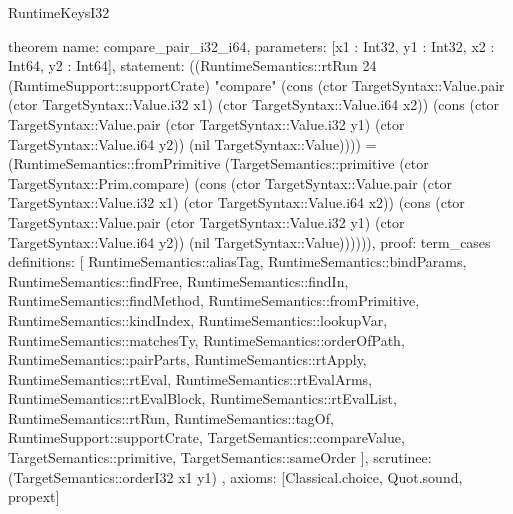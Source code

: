 \begin{lexlean}{RuntimeKeysI32}
\begin{semanticmodule}
theorem{
  name: compare_pair_i32_i64,
  parameters: [x1 : Int32, y1 : Int32, x2 : Int64, y2 : Int64],
  statement: ((RuntimeSemantics::rtRun 24 (RuntimeSupport::supportCrate) "compare" (cons (ctor TargetSyntax::Value.pair (ctor TargetSyntax::Value.i32 x1) (ctor TargetSyntax::Value.i64 x2)) (cons (ctor TargetSyntax::Value.pair (ctor TargetSyntax::Value.i32 y1) (ctor TargetSyntax::Value.i64 y2)) (nil TargetSyntax::Value)))) = (RuntimeSemantics::fromPrimitive (TargetSemantics::primitive (ctor TargetSyntax::Prim.compare) (cons (ctor TargetSyntax::Value.pair (ctor TargetSyntax::Value.i32 x1) (ctor TargetSyntax::Value.i64 x2)) (cons (ctor TargetSyntax::Value.pair (ctor TargetSyntax::Value.i32 y1) (ctor TargetSyntax::Value.i64 y2)) (nil TargetSyntax::Value)))))),
  proof: term_cases{
    definitions: [
      RuntimeSemantics::aliasTag,
      RuntimeSemantics::bindParams,
      RuntimeSemantics::findFree,
      RuntimeSemantics::findIn,
      RuntimeSemantics::findMethod,
      RuntimeSemantics::fromPrimitive,
      RuntimeSemantics::kindIndex,
      RuntimeSemantics::lookupVar,
      RuntimeSemantics::matchesTy,
      RuntimeSemantics::orderOfPath,
      RuntimeSemantics::pairParts,
      RuntimeSemantics::rtApply,
      RuntimeSemantics::rtEval,
      RuntimeSemantics::rtEvalArms,
      RuntimeSemantics::rtEvalBlock,
      RuntimeSemantics::rtEvalList,
      RuntimeSemantics::rtRun,
      RuntimeSemantics::tagOf,
      RuntimeSupport::supportCrate,
      TargetSemantics::compareValue,
      TargetSemantics::primitive,
      TargetSemantics::sameOrder
    ],
    scrutinee: (TargetSemantics::orderI32 x1 y1)
  },
  axioms: [Classical.choice, Quot.sound, propext]
}
\end{semanticmodule}
\end{lexlean}
